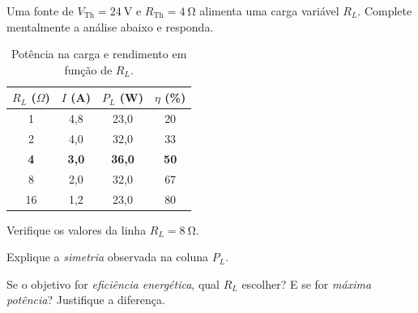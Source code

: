 \begin{questao}[3]{}
Uma fonte de $V_{\text{Th}}=\SI{24}{\volt}$ e $R_{\text{Th}}=\SI{4}{\ohm}$
alimenta uma carga variável $R_L$. Complete mentalmente a análise abaixo e
responda.

\begin{table}[H]
\centering\small\sffamily
\setlength{\arraystretch}{1.25}
\begin{tabular}{@{}c c c c@{}}
\toprule
$R_L$ ($\Omega$) & $I$ (A) & $P_L$ (W) & $\eta$ (\%)\\
\midrule
1  & 4,8 & 23,0 & 20\\
2  & 4,0 & 32,0 & 33\\
\textbf{4}  & \textbf{3,0} & \textbf{36,0} & \textbf{50}\\
8  & 2,0 & 32,0 & 67\\
16 & 1,2 & 23,0 & 80\\
\bottomrule
\end{tabular}
\caption{Potência na carga e rendimento em função de $R_L$.}
\end{table}

\begin{itensq}
\item Verifique os valores da linha $R_L=\SI{8}{\ohm}$.
\item Explique a \emph{simetria} observada na coluna $P_L$.
\item Se o objetivo for \emph{eficiência energética}, qual $R_L$ escolher? E se
      for \emph{máxima potência}? Justifique a diferença.
\end{itensq}
\end{questao}
